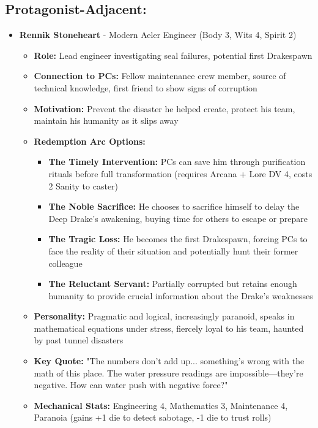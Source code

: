 \documentclass[11pt]{article}
\begin{document}
\subsection{Protagonist-Adjacent:}
\begin{itemize}
\item \textbf{Rennik Stoneheart} - Modern Aeler Engineer (Body 3, Wits 4, Spirit 2)
  \begin{itemize}
  \item \textbf{Role:} Lead engineer investigating seal failures, potential first Drakespawn
  \item \textbf{Connection to PCs:} Fellow maintenance crew member, source of technical knowledge, first friend to show signs of corruption
  \item \textbf{Motivation:} Prevent the disaster he helped create, protect his team, maintain his humanity as it slips away
  \item \textbf{Redemption Arc Options:}
    \begin{itemize}
    \item \textbf{The Timely Intervention:} PCs can save him through purification rituals before full transformation (requires Arcana + Lore DV 4, costs 2 Sanity to caster)
    \item \textbf{The Noble Sacrifice:} He chooses to sacrifice himself to delay the Deep Drake's awakening, buying time for others to escape or prepare
    \item \textbf{The Tragic Loss:} He becomes the first Drakespawn, forcing PCs to face the reality of their situation and potentially hunt their former colleague
    \item \textbf{The Reluctant Servant:} Partially corrupted but retains enough humanity to provide crucial information about the Drake's weaknesses
    \end{itemize}
  \item \textbf{Personality:} Pragmatic and logical, increasingly paranoid, speaks in mathematical equations under stress, fiercely loyal to his team, haunted by past tunnel disasters
  \item \textbf{Key Quote:} "The numbers don't add up... something's wrong with the math of this place. The water pressure readings are impossible—they're negative. How can water push with negative force?"
  \item \textbf{Mechanical Stats:} Engineering 4, Mathematics 3, Maintenance 4, Paranoia (gains +1 die to detect sabotage, -1 die to trust rolls)
  \end{itemize}

\end{itemize}
\end{document}
